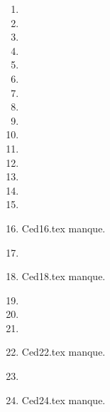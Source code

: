 \begin{enumerate}
  \item  
  \item  
  \item  
  \item  
  \item  
  \item  
  \item  
  \item  
  \item  
  \item  
  \item  
  \item  
  \item  
  \item  
  \item  
  \item Ced16.tex manque. 
  \item  
  \item Ced18.tex manque. 
  \item  
  \item  
  \item  
  \item Ced22.tex manque. 
  \item  
  \item Ced24.tex manque. 
\end{enumerate} 

